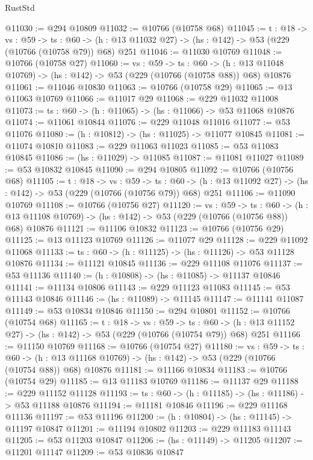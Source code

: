 \begin{lexlean}{RustStd}
\begin{coremodule}
@11030 := @294 @10809
@11032 := @10766 (@10758 @68)
@11045 := {t : @18} ->
  {vs : @59} ->
  {ts : @60} -> (h : @13 @11032 @27) -> (hs : @142) -> @53 (@229 (@10766 (@10758 @79)) @68) @251
@11046 := @11030 @10769
@11048 := @10766 (@10758 @27)
@11060 := {vs : @59} ->
  {ts : @60} ->
  (h : @13 @11048 @10769) -> (hs : @142) -> @53 (@229 (@10766 (@10758 @88)) @68) @10876
@11061 := @11046 @10830
@11063 := @10766 (@10758 @29)
@11065 := @13 @11063 @10769
@11066 := @11017 @29
@11068 := @229 @11032 @11008
@11073 := {ts : @60} -> (h : @11065) -> (hs : @11066) -> @53 @11068 @10876
@11074 := @11061 @10844
@11076 := @229 @11048 @11016
@11077 := @53 @11076
@11080 := (h : @10812) -> (hs : @11025) -> @11077 @10845
@11081 := @11074 @10810
@11083 := @229 @11063 @11023
@11085 := @53 @11083 @10845
@11086 := (hs : @11029) -> @11085
@11087 := @11081 @11027
@11089 := @53 @10832 @10845
@11090 := @294 @10805
@11092 := @10766 (@10756 @68)
@11105 := {t : @18} ->
  {vs : @59} ->
  {ts : @60} -> (h : @13 @11092 @27) -> (hs : @142) -> @53 (@229 (@10766 (@10756 @79)) @68) @251
@11106 := @11090 @10769
@11108 := @10766 (@10756 @27)
@11120 := {vs : @59} ->
  {ts : @60} ->
  (h : @13 @11108 @10769) -> (hs : @142) -> @53 (@229 (@10766 (@10756 @88)) @68) @10876
@11121 := @11106 @10832
@11123 := @10766 (@10756 @29)
@11125 := @13 @11123 @10769
@11126 := @11077 @29
@11128 := @229 @11092 @11068
@11133 := {ts : @60} -> (h : @11125) -> (hs : @11126) -> @53 @11128 @10876
@11134 := @11121 @10845
@11136 := @229 @11108 @11076
@11137 := @53 @11136
@11140 := (h : @10808) -> (hs : @11085) -> @11137 @10846
@11141 := @11134 @10806
@11143 := @229 @11123 @11083
@11145 := @53 @11143 @10846
@11146 := (hs : @11089) -> @11145
@11147 := @11141 @11087
@11149 := @53 @10834 @10846
@11150 := @294 @10801
@11152 := @10766 (@10754 @68)
@11165 := {t : @18} ->
  {vs : @59} ->
  {ts : @60} -> (h : @13 @11152 @27) -> (hs : @142) -> @53 (@229 (@10766 (@10754 @79)) @68) @251
@11166 := @11150 @10769
@11168 := @10766 (@10754 @27)
@11180 := {vs : @59} ->
  {ts : @60} ->
  (h : @13 @11168 @10769) -> (hs : @142) -> @53 (@229 (@10766 (@10754 @88)) @68) @10876
@11181 := @11166 @10834
@11183 := @10766 (@10754 @29)
@11185 := @13 @11183 @10769
@11186 := @11137 @29
@11188 := @229 @11152 @11128
@11193 := {ts : @60} -> (h : @11185) -> (hs : @11186) -> @53 @11188 @10876
@11194 := @11181 @10846
@11196 := @229 @11168 @11136
@11197 := @53 @11196
@11200 := (h : @10804) -> (hs : @11145) -> @11197 @10847
@11201 := @11194 @10802
@11203 := @229 @11183 @11143
@11205 := @53 @11203 @10847
@11206 := (hs : @11149) -> @11205
@11207 := @11201 @11147
@11209 := @53 @10836 @10847

\end{coremodule}
\end{lexlean}
